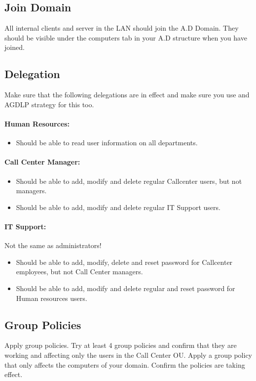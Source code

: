 \documentclass[paper=a4, fontsize=11pt]{report} %
\begin{document}
\subsection{Join Domain}
All internal clients and server in the LAN should join the A.D Domain. They should be visible under the computers tab in your A.D structure when you have joined.

\subsection{Delegation}
Make sure that the following delegations are in effect and make sure you use and AGDLP strategy for this too.
\paragraph{Human Resources:}
\begin{itemize}
	\item Should be able to read user information on all departments.
\end{itemize}

\paragraph{Call Center Manager:}
\begin{itemize}
	\item Should be able to add, modify and delete regular Callcenter users, but not managers.
	\item Should be able to add, modify and delete regular IT Support users.
\end{itemize}

\paragraph{IT Support:}
Not the same as administrators!
\begin{itemize}
	\item Should be able to add, modify, delete and reset password for Callcenter employees, but not Call Center managers.
	\item Should be able to add, modify and delete regular and reset password for Human resources users.
\end{itemize}

\subsection{Group Policies}
Apply group policies. Try at least 4 group policies and confirm that they are working and affecting only the users in the Call Center OU.
Apply a group policy that only affects the computers of your domain.
Confirm the policies are taking effect.
\end{document}

